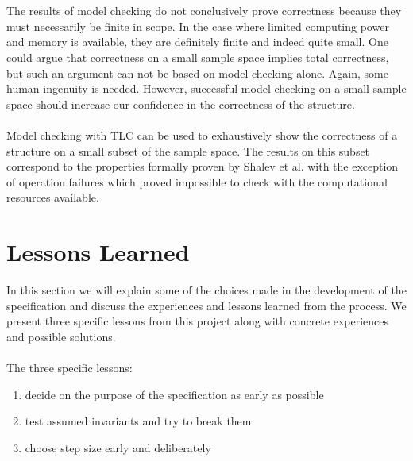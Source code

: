 \documentclass{uit-thesis}
\begin{document}
\\\\
The results of model checking do not conclusively prove correctness because they must necessarily be finite in scope. In the case where limited computing power and memory is available, they are definitely finite and indeed quite small. One could argue that correctness on a small sample space implies total correctness, but such an argument can not be based on model checking alone. Again, some human ingenuity is needed. However, successful model checking on a small sample space should increase our confidence in the correctness of the structure.
\\\\
Model checking with TLC can be used to exhaustively show the correctness of a structure on a small subset of the sample space. The results on this subset correspond to the properties formally proven by Shalev et al. with the exception of operation failures which proved impossible to check with the computational resources available.

\section{Lessons Learned}
In this section we will explain some of the choices made in the development of the specification and discuss the experiences and lessons learned from the process. We present three specific lessons from this project along with concrete experiences and possible solutions.
\\\\
The three specific lessons:
\begin{enumerate}[label=\textbf{\arabic*}.]
    \item decide on the purpose of the specification as early as possible
    \item test assumed invariants and try to break them
    \item choose step size early and deliberately
\end{enumerate}
\end{document}
